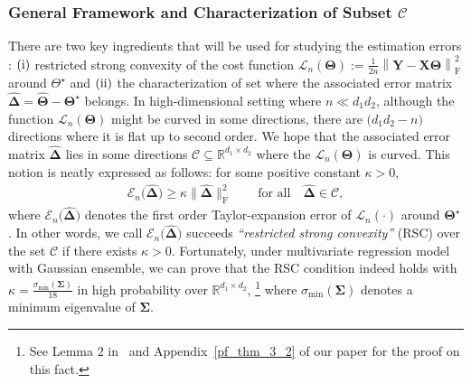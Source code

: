 \documentclass[alpha-refs]{wiley-article}
\newcommand{\RN}[1]{ \textup{\uppercase\expandafter{\romannumeral#1}} }
\begin{document}
\subsubsection{General Framework and Characterization of Subset $\mathcal{C}$} \label{GF}
There are two key ingredients that will be used for studying the estimation errors : $(\RN{1})$ restricted strong convexity of the cost function $\mathcal{L}_{n}(\boldsymbol{\Theta}):= \frac{1}{2n} \left\| \boldsymbol{Y}-\boldsymbol{X}\boldsymbol{\Theta} \right\|_{\text{F}}^{2}$ around $\Theta^\star$ and
$(\RN{2})$ the characterization of set where the associated error matrix $\boldsymbol{\widehat{\Delta}}=\widehat{\boldsymbol{\Theta}}-\boldsymbol{\Theta^{\star}}$ belongs.
In high-dimensional setting where $n \ll d_{1}d_{2}$, although the function $\mathcal{L}_{n}(\boldsymbol{\Theta})$ might be curved in some directions, there are $\big(d_{1}d_{2}-n\big)$ directions where it is flat up to second order.
We hope that the associated error matrix $\boldsymbol{\widehat{\Delta}}$
lies in some directions $\mathcal{C}\subseteq \mathbb{R}^{d_{1}\times d_{2}}$ where the $\mathcal{L}_{n}(\boldsymbol{\Theta})$ is curved.
This notion is neatly expressed as follows: for some positive constant $\kappa>0$,
\begin{align} \label{RSC}
    \mathcal{E}_{n}\big(\boldsymbol{\widehat{\Delta}})\geq \kappa \| \boldsymbol{\widehat{\Delta}} \|_{\text{F}}^{2} \qquad \text{for all} \quad \boldsymbol{\widehat{\Delta}}\in\mathcal{C},
\end{align}
where $\mathcal{E}_{n}\big(\boldsymbol{\widehat{\Delta}})$ denotes the first order Taylor-expansion error of $\mathcal{L}_{n}(\cdot)$ around $\boldsymbol{\Theta}^\star$.
In other words, we call $\mathcal{E}_{n}\big(\boldsymbol{\widehat{\Delta}})$ succeeds \textit{``restricted strong convexity''} (RSC) over the set $\mathcal{C}$ if there exists $\kappa>0$.
Fortunately, under multivariate regression model with Gaussian ensemble, we can prove that the RSC condition indeed holds with $\kappa=\frac{\sigma_{\text{min}}(\boldsymbol{\Sigma})}{18}$ in high probability over $\mathbb{R}^{d_{1} \times d_{2}}$,
\footnote{See Lemma $2$ in~\citet{negahban2011estimation} and Appendix~\ref{pf_thm_3_2} of our paper for the proof on this fact.} where $\sigma_{\text{min}}(\boldsymbol{\Sigma})$ denotes a minimum eigenvalue of $\boldsymbol{\Sigma}$.
\end{document}
